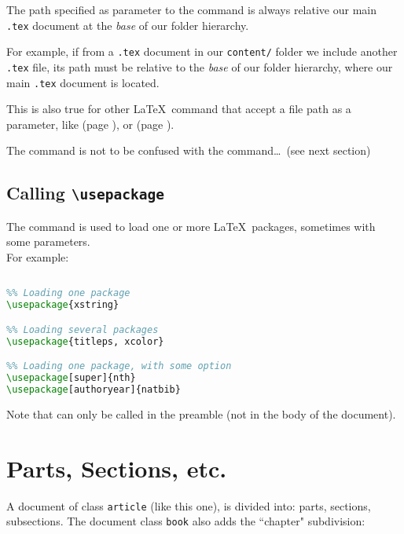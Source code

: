 \begin{note}
The path specified as parameter to the  command 
is always relative our main \texttt{.tex} document at the \emph{base} of our folder hierarchy.
\end{note}

For example, if from a \texttt{.tex} document in our \texttt{content/} folder we include another \texttt{.tex} file, its path must be relative to the \emph{base} of our folder hierarchy, where our main \texttt{.tex} document is located.

\begin{note}
This is also true for other \LaTeX\ command that accept a file path as a parameter, like  (page \pageref{includegraphics}), or  (page \pageref{lstinputlisting}).
\end{note}

\bigskip

The  command is not to be confused with the  command\dots\
(see next section) \\


\subsection{Calling \texttt{\textbackslash usepackage}}
The  command is used to load one or more \LaTeX\ packages, sometimes with some parameters. \\

For example:
\begin{lstlisting}[language=tex]
%%% In the preamble
	
%% Loading one package
\usepackage{xstring}

%% Loading several packages
\usepackage{titleps, xcolor}

%% Loading one package, with some option
\usepackage[super]{nth}
\usepackage[authoryear]{natbib}
\end{lstlisting}

Note that  can only be called in the preamble (not in the body of the document).

\newpage
\section{Parts, Sections, etc.} \label{parts-sections}

A document of class \texttt{article} (like this one), is divided into: parts, sections, subsections. 
The document class \texttt{book} also adds the ``chapter" subdivision: \\

